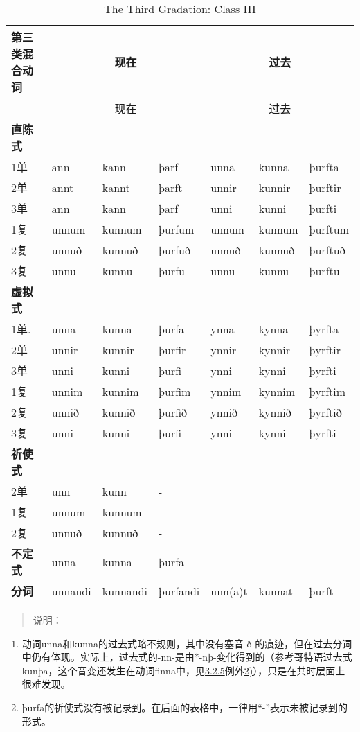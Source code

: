 \begin{longtable}{lllllll}
\caption[The Third Gradation: Class III]{The Third Gradation: Class
III}\tabularnewline
\toprule
第三类混合动词 &\multicolumn{3}{c}{现在} &\multicolumn{3}{c}{过去} \\\midrule\endfirsthead{} &\multicolumn{3}{c}{现在} &\multicolumn{3}{c}{过去} \\
\midrule
\endhead
\bottomrule
\endfoot
\textbf{直陈式} & ~ & ~ & ~ & ~ & ~ & ~ \\
1单 & ann & kann & þarf & unna & kunna & þurfta \\
2单 & annt & kannt & þarft & unnir & kunnir & þurftir \\
3单 & ann & kann & þarf & unni & kunni & þurfti \\
1复 & unnum & kunnum & þurfum & unnum & kunnum & þurftum \\
2复 & unnuð & kunnuð & þurfuð & unnuð & kunnuð & þurftuð \\
3复 & unnu & kunnu & þurfu & unnu & kunnu & þurftu \\
\textbf{虚拟式} & ~ & ~ & ~ & ~ & ~ & ~ \\
1单. & unna & kunna & þurfa & ynna & kynna & þyrfta \\
2单 & unnir & kunnir & þurfir & ynnir & kynnir & þyrftir \\
3单 & unni & kunni & þurfi & ynni & kynni & þyrfti \\
1复 & unnim & kunnim & þurfim & ynnim & kynnim & þyrftim \\
2复 & unnið & kunnið & þurfið & ynnið & kynnið & þyrftið \\
3复 & unni & kunni & þurfi & ynni & kynni & þyrfti \\
\textbf{祈使式} & ~ & ~ & ~ & ~ & ~ & ~ \\
2单 & unn & kunn & - & ~ & ~ & ~ \\
1复 & unnum & kunnum & - & ~ & ~ & ~ \\
2复 & unnuð & kunnuð & - & ~ & ~ & ~ \\
\textbf{不定式} & unna & kunna & þurfa & ~ & ~ & ~ \\
\textbf{分词} & unnandi & kunnandi & þurfandi & unn(a)t & kunnat &
þurft \\
\end{longtable}

\begin{quote}
说明：
\end{quote}

\begin{enumerate}
\def\labelenumi{\arabic{enumi})}
\item
  动词unna和kunna的过去式略不规则，其中没有塞音-ð-的痕迹，但在过去分词中仍有体现。实际上，过去式的-nn-是由*-nþ-变化得到的（参考哥特语过去式kunþa，这个音变还发生在动词finna中，见\hyperref[ux7b2cux4e09ux5f3aux53d8ux4f4dux6cd5]{3.2.5}例外\hyperref[_Ref116921872]{2)}），只是在共时层面上很难发现。
\item
  þurfa的祈使式没有被记录到。在后面的表格中，一律用``-''表示未被记录到的形式。
\end{enumerate}

